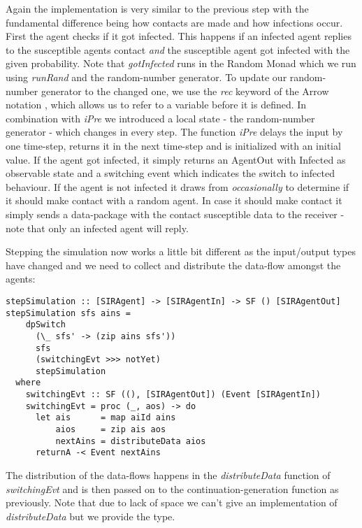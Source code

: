 Again the implementation is very similar to the previous step with the fundamental difference being how contacts are made and how infections occur. First the agent checks if it got infected. This happens if an infected agent replies to the susceptible agents contact \textit{and} the susceptible agent got infected with the given probability. Note that \textit{gotInfected} runs in the Random Monad which we run using \textit{runRand} and the random-number generator. To update our random-number generator to the changed one, we use the \textit{rec} keyword of the Arrow notation \cite{paterson_new_2001}, which allows us to refer to a variable before it is defined. In combination with \textit{iPre} we introduced a local state - the random-number generator - which changes in every step. The function \textit{iPre} delays the input by one time-step, returns it in the next time-step and is initialized with an initial value. If the agent got infected, it simply returns an AgentOut with Infected as observable state and a switching event which indicates the switch to infected behaviour.
If the agent is not infected it draws from \textit{occasionally} to determine if it should make contact with a random agent. In case it should make contact it simply sends a data-package with the contact susceptible data to the receiver - note that only an infected agent will reply.

Stepping the simulation now works a little bit different as the input/output types have changed and we need to collect and distribute the data-flow amongst the agents:

\begin{verbatim}
stepSimulation :: [SIRAgent] -> [SIRAgentIn] -> SF () [SIRAgentOut]
stepSimulation sfs ains =
    dpSwitch
      (\_ sfs' -> (zip ains sfs'))
      sfs
      (switchingEvt >>> notYet)
      stepSimulation
  where
    switchingEvt :: SF ((), [SIRAgentOut]) (Event [SIRAgentIn])
    switchingEvt = proc (_, aos) -> do
      let ais      = map aiId ains
          aios     = zip ais aos
          nextAins = distributeData aios
      returnA -< Event nextAins
\end{verbatim}

The distribution of the data-flows happens in the \textit{distributeData} function of \textit{switchingEvt} and is then passed on to the continuation-generation function as previously. Note that due to lack of space we can't give an implementation of \textit{distributeData} but we provide the type.

